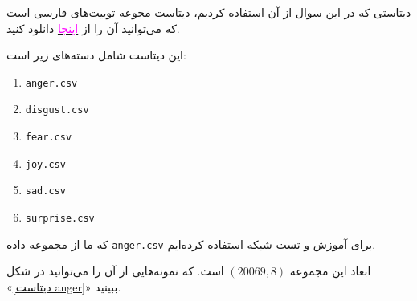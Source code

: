 \begin{qsolve}
	دیتاستی که در این سوال از آن استفاده کردیم، دیتاست مجوعه توییت‌های فارسی است که می‌توانید آن را از \href{https://www.kaggle.com/datasets/behdadkarimi/persian-tweets-emotional-dataset}{\textcolor{magenta}{اینجا}} دانلود کنید.
	
	این دیتاست شامل دسته‌های زیر است:
	\begin{enumerate}
		\item \texttt{anger.csv}
		\item \texttt{disgust.csv}
		\item \texttt{fear.csv}
		\item \texttt{joy.csv}
		\item \texttt{sad.csv}
		\item \texttt{surprise.csv}
	\end{enumerate}
	
	که ما از مجموعه داده \texttt{anger.csv} برای آموزش و تست شبکه استفاده کرده‌ایم.
	
	ابعاد این مجموعه $(20069, 8)$ است. که نمونه‌هایی از آن را می‌توانید در شکل «\ref{دیتاست anger}» ببینید.
\end{qsolve}




